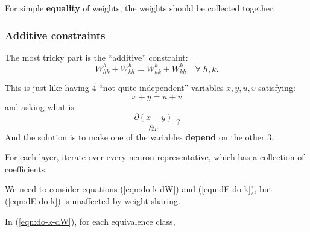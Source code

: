 For simple \textbf{equality} of weights, the weights should be collected together.


\subsubsection{Additive constraints}

The most tricky part is the ``additive'' constraint:
\begin{equation}
W_{hk}^h + W_{kh}^h = W_{hk}^k + W_{kh}^k \quad \forall \; h,k .
\end{equation}

This is just like having 4 ``not quite independent'' variables $x, y, u, v$ satisfying:
\begin{equation}
x + y = u + v
\end{equation}
and asking what is
\begin{equation}
\frac{\partial (x + y)}{\partial x} \mbox{ ?}
\end{equation}
And the solution is to make one of the variables \textbf{depend} on the other 3.

For each layer, iterate over every neuron representative, which has a collection of coefficients.

We need to consider equations (\ref{eqn:do-k-dW}) and (\ref{eqn:dE-do-k}), but (\ref{eqn:dE-do-k}) is unaffected by weight-sharing.

In (\ref{eqn:do-k-dW}), for each equivalence class, 


